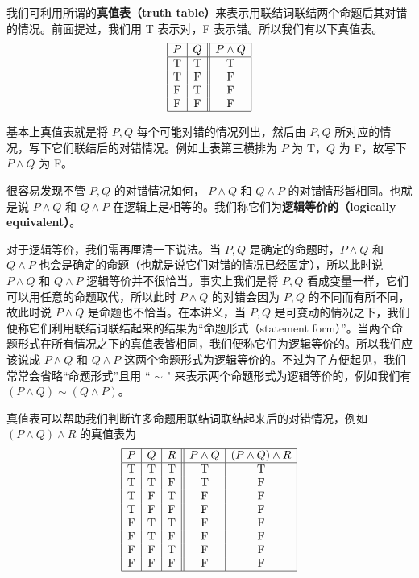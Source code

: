 我们可利用所谓的\textbf{真值表（truth table）}来表示用联结词联结两个命题后其对错的情况。前面提过，我们用 T 表示对，F 表示错。所以我们有以下真值表。
\[
\begin{array}{|c|c||c|}
\hline
P & Q & P \land Q \\
\hline
\mathrm{T} & \mathrm{T} & \mathrm{T} \\
\mathrm{T} & \mathrm{F} & \mathrm{F} \\
\mathrm{F} & \mathrm{T} & \mathrm{F} \\
\mathrm{F} & \mathrm{F} & \mathrm{F} \\
\hline
\end{array}
\]

基本上真值表就是将 \(P, Q\) 每个可能对错的情况列出，然后由 \(P, Q\) 所对应的情况，写下它们联结后的对错情况。例如上表第三横排为 \(P\) 为 T，\(Q\) 为 F，故写下 \(P \land Q\) 为 F。

很容易发现不管 \(P, Q\) 的对错情况如何， \(P \land Q\) 和 \(Q \land P\) 的对错情形皆相同。也就是说 \(P \land Q\) 和 \(Q \land P\) 在逻辑上是相等的。我们称它们为\textbf{逻辑等价的（logically equivalent）}。

对于逻辑等价，我们需再厘清一下说法。当 \(P, Q\) 是确定的命题时，\(P \land Q\) 和 \(Q \land P\) 也会是确定的命题（也就是说它们对错的情况已经固定），所以此时说 \(P \land Q\) 和 \(Q \land P\) 逻辑等价并不很恰当。事实上我们是将 \(P, Q\) 看成变量一样，它们可以用任意的命题取代，所以此时 \(P \land Q\) 的对错会因为 \(P, Q\) 的不同而有所不同，故此时说 \(P \land Q\) 是命题也不恰当。在本讲义，当 \(P, Q\) 是可变动的情况之下，我们便称它们利用联结词联结起来的结果为“命题形式（statement form）”。当两个命题形式在所有情况之下的真值表皆相同，我们便称它们为逻辑等价的。所以我们应该说成 \(P \land Q\) 和 \(Q \land P\) 这两个命题形式为逻辑等价的。不过为了方便起见，我们常常会省略“命题形式”且用 `` \(\sim\) " 来表示两个命题形式为逻辑等价的，例如我们有 \((P \land Q) \sim (Q \land P)\)。

真值表可以帮助我们判断许多命题用联结词联结起来后的对错情况，例如 \((P \land Q) \land R\) 的真值表为
\[
\begin{array}{|c|c|c||c|c|}
\hline
P & Q & R & P\land Q & (P\land Q)\land R \\
\hline
\mathrm{T} & \mathrm{T} & \mathrm{T} & \mathrm{T} & \mathrm{T} \\
\mathrm{T} & \mathrm{T} & \mathrm{F} & \mathrm{T} & \mathrm{F} \\
\mathrm{T} & \mathrm{F} & \mathrm{T} & \mathrm{F} & \mathrm{F} \\
\mathrm{T} & \mathrm{F} & \mathrm{F} & \mathrm{F} & \mathrm{F} \\
\mathrm{F} & \mathrm{T} & \mathrm{T} & \mathrm{F} & \mathrm{F} \\
\mathrm{F} & \mathrm{T} & \mathrm{F} & \mathrm{F} & \mathrm{F} \\
\mathrm{F} & \mathrm{F} & \mathrm{T} & \mathrm{F} & \mathrm{F} \\
\mathrm{F} & \mathrm{F} & \mathrm{F} & \mathrm{F} & \mathrm{F} \\
\hline
\end{array}
\]

